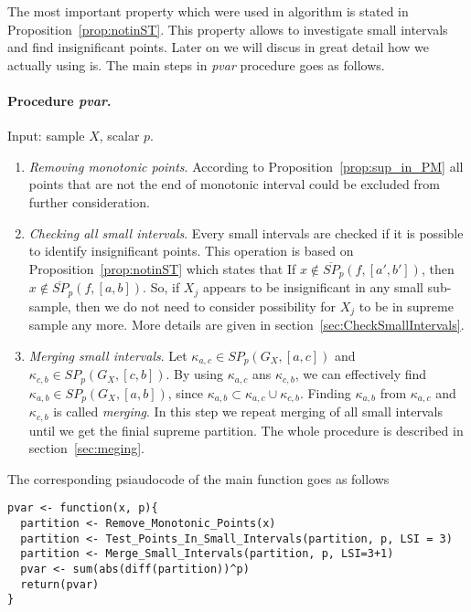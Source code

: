 \documentclass[12pt, a4paper]{article}
\numberwithin{equation}{section}
\begin{document}
The most important property which were used in algorithm is
stated in Proposition~\ref{prop:notinST}. This property
allows to investigate small intervals and find insignificant points.
Later on we will discus in great detail how we actually using is.
The main steps in \emph{pvar} procedure
goes as follows.


\paragraph{Procedure \emph{pvar}.}
Input: sample $X$, scalar $p$.

\begin{enumerate}
  \item \emph{Removing monotonic points}. According to 
  Proposition~\ref{prop:sup_in_PM}
  all points that are not the end of 
  monotonic interval could be excluded 
  from further consideration. 
  
  \item \emph{Checking all small intervals}. Every small intervals are
    checked if it is possible to 
    identify insignificant points. 
    This operation is based on 
    Proposition~\ref{prop:notinST} which states that 
    If $x \notin \overline{SP}_p(f, [a', b'])$, then 
    $x \notin \overline{SP}_p(f, [a, b])$.
    So, if $X_j$ appears to be insignificant in
    any small sub-sample, then
    we do not need to consider possibility for
    $X_j$ to be in supreme sample any more. 
    More details are given in section~\ref{sec:CheckSmallIntervals}.  
 
  \item \emph{Merging small intervals}.  
   Let $\kappa_{a,c} \in SP_p(G_X, [a,c])$ and
   $\kappa_{c,b} \in SP_p(G_X, [c, b])$. By using $\kappa_{a,c}$
   ans $\kappa_{c,b}$, we can effectively
   find $\kappa_{a,b} \in SP_p(G_X, [a, b])$, since
   $\kappa_{a,b} \subset \kappa_{a,c} \cup \kappa_{c,b}$. 
   Finding
   $\kappa_{a,b}$ from $\kappa_{a,c}$ and $\kappa_{c,b}$ 
   is called \emph{merging}.
   In this step we repeat merging of all small intervals until
   we get the finial supreme partition.
   The whole procedure is described in section~\ref{sec:meging}.  
  
\end{enumerate}

The corresponding psiaudocode of the main function goes as follows
\begin{lstlisting}
pvar <- function(x, p){
  partition <- Remove_Monotonic_Points(x) 
  partition <- Test_Points_In_Small_Intervals(partition, p, LSI = 3) 
  partition <- Merge_Small_Intervals(partition, p, LSI=3+1)
  pvar <- sum(abs(diff(partition))^p)  
  return(pvar)
}
\end{lstlisting}
  
\end{document}
